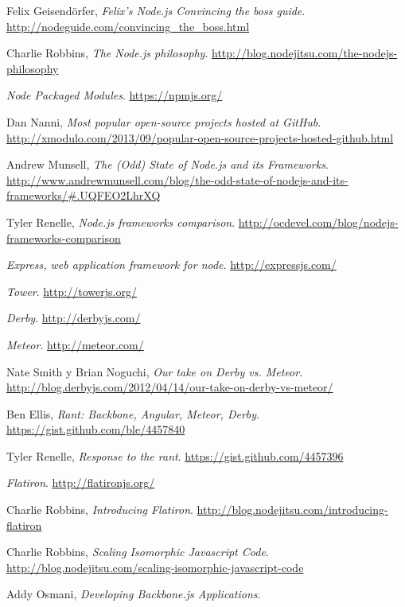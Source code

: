\documentclass[doc,helv,longtable]{article}
\begin{document}
\begin{thebibliography}{150}
  Felix Geisendörfer,
  \emph{Felix's Node.js Convincing the boss guide}.
  \url{http://nodeguide.com/convincing_the_boss.html}

  Charlie Robbins,
  \emph{The Node.js philosophy}.
  \url{http://blog.nodejitsu.com/the-nodejs-philosophy}

  \emph{Node Packaged Modules}.
  \url{https://npmjs.org/}

  Dan Nanni, 
  \emph{Most popular open-source projects hosted at GitHub}.
  \url{http://xmodulo.com/2013/09/popular-open-source-projects-hosted-github.html}

  Andrew Munsell, 
  \emph{The (Odd) State of Node.js and its Frameworks}.
  \url{http://www.andrewmunsell.com/blog/the-odd-state-of-nodejs-and-its-frameworks/#.UQFEO2LhrXQ}

  Tyler Renelle, 
  \emph{Node.js frameworks comparison}.
  \url{http://ocdevel.com/blog/nodejs-frameworks-comparison}

  \emph{Express, web application framework for node}.
  \url{http://expressjs.com/}

  \emph{Tower}.
  \url{http://towerjs.org/}

  \emph{Derby}.
  \url{http://derbyjs.com/}

  \emph{Meteor}.
  \url{http://meteor.com/}

  Nate Smith y Brian Noguchi,
  \emph{Our take on Derby vs. Meteor}.
  \url{http://blog.derbyjs.com/2012/04/14/our-take-on-derby-vs-meteor/}

  Ben Ellis,
  \emph{Rant: Backbone, Angular, Meteor, Derby}.
  \url{https://gist.github.com/ble/4457840}

  Tyler Renelle,
  \emph{Response to the rant}.
  \url{https://gist.github.com/4457396}

  \emph{Flatiron}.
  \url{http://flatironjs.org/}

  Charlie Robbins,
  \emph{Introducing Flatiron}.
  \url{http://blog.nodejitsu.com/introducing-flatiron}

  Charlie Robbins,
  \emph{Scaling Isomorphic Javascript Code}.
  \url{http://blog.nodejitsu.com/scaling-isomorphic-javascript-code}

  Addy Osmani,
  \emph{Developing Backbone.js Applications}.


\end{thebibliography}
\end{document}
